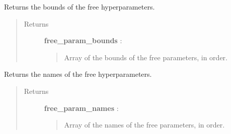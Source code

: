 \documentclass[letterpaper,10pt,english]{sphinxmanual}
\begin{document}
\begin{fulllineitems}
\begin{fulllineitems}
\label{gptools.kernel:gptools.kernel.warping.WarpingFunction.free_param_bounds}
Returns the bounds of the free hyperparameters.
\begin{quote}\begin{description}
\item[{Returns}] \leavevmode
\textbf{free\_param\_bounds} : 
\begin{quote}

Array of the bounds of the free parameters, in order.
\end{quote}

\end{description}\end{quote}

\end{fulllineitems}


\begin{fulllineitems}
\label{gptools.kernel:gptools.kernel.warping.WarpingFunction.free_param_names}
Returns the names of the free hyperparameters.
\begin{quote}\begin{description}
\item[{Returns}] \leavevmode
\textbf{free\_param\_names} : 
\begin{quote}

Array of the names of the free parameters, in order.
\end{quote}

\end{description}\end{quote}

\end{fulllineitems}


\end{fulllineitems}

\end{document}
